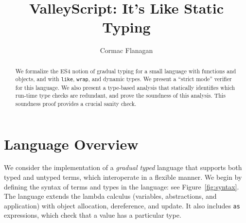 \documentclass{article}
\newcommand{\myclearpage}{}
\newcommand{\comment}[1]{}
\newcommand{\Int}{\t{Int}}
\newcommand{\Bool}{\t{Bool}}
\renewcommand{\t}[1]{{\tt #1}}
\begin{document}
\title{ValleyScript: It's Like Static Typing
}
\author{Cormac Flanagan}


\maketitle

\begin{abstract}
We formalize the ES4 notion of gradual typing for a small language with functions and objects, and with \t{like}, \t{wrap}, and dynamic types.
We present a ``strict mode'' verifier for this language.
We also present a type-based analysis that statically identifies which run-time type checks are redundant, 
and prove the soundness of this analysis. 
This soundness proof provides a crucial sanity check.
\end{abstract}

\comment{
\section{Change Log}
\begin{itemize}
\item
6 Oct: extended with generic function, as a warm-up for implementing all this in the verifier.
\item
8 Nov: extended with conversion from $\Int$ to $\Bool$.
\item
14 Nov: extended with generic functions.
\item
14 Nov: added wrap as a type constructor.
\item 
20 Nov: rework based on allocated and current types
\item
26 Nov: rework with two subtype relations
\item
27 Nov: rework with ideas from Siek+Taha
\item
todo: check proofs for like, wrap, and int to bool conversions
\item
todo: added typedefs and generics
\item
todo: resolve contravariant subtyping on function domains
\end{itemize}
}
\myclearpage
\section{Language Overview}

We consider the implementation of a \emph{gradual typed} language that supports both
typed and untyped terms, which interoperate in a flexible manner.
We begin by defining the syntax of terms and types in the language: see Figure~\ref{fig:syntax}.
The language extends  the lambda calculus (variables, abstractions, and application)
with object allocation, dereference, and update. 
It also includes \t{as} expressions, which check that a value has a particular type.
\end{document}
